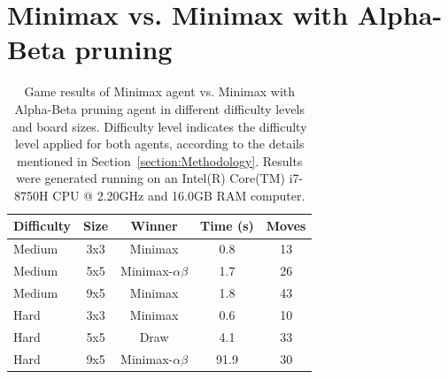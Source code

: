 \documentclass[journal]{IEEEtran}
\begin{document}
\section{Minimax vs. Minimax with Alpha-Beta pruning}
\label{Appendix:resultsMinimaxvsAB}
\begin{table}[h!]
    \caption{Game results of Minimax agent vs. Minimax with Alpha-Beta pruning agent in different difficulty levels and board sizes. Difficulty level indicates the difficulty level applied for both agents, according to the details mentioned in Section~\ref{section:Methodology}. Results were generated running on an Intel(R) Core(TM) i7-8750H CPU @ 2.20GHz and 16.0GB RAM computer.}
    \centering
    \label{tab:MinimaxvsAB}
        \begin{tabular}{l c c c c}
        \hline
        Difficulty & Size & Winner & Time (s) & Moves \\
        \hline
        Medium & 3x3 & Minimax               & 0.8 & 13 \\
        Medium & 5x5 & Minimax-$\alpha\beta$ & 1.7 & 26 \\
        Medium & 9x5 & Minimax               & 1.8 & 43 \\
        \addlinespace
        Hard   & 3x3 & Minimax               & 0.6 & 10 \\
        Hard   & 5x5 & Draw                  & 4.1 & 33 \\
        Hard   & 9x5 & Minimax-$\alpha\beta$ & 91.9 & 30 \\
        \hline
        \end{tabular}
\end{table}

\newpage
\end{document}

